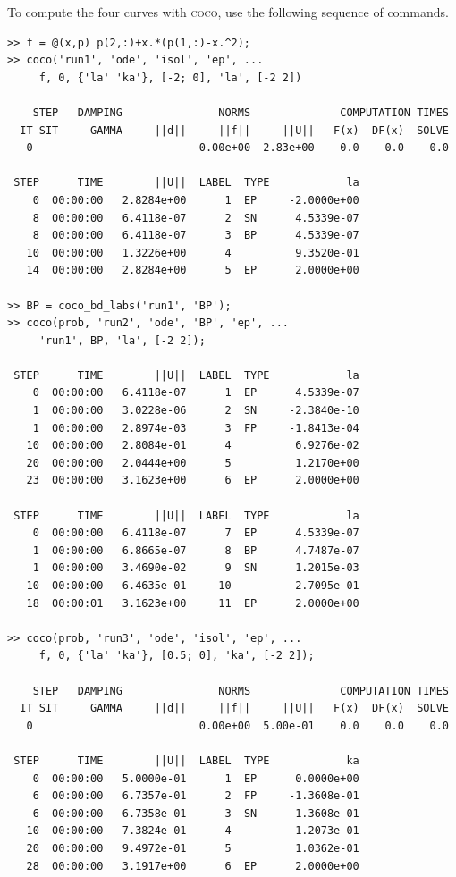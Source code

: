 To compute the four curves with \textsc{coco}, use the following sequence of commands.
\begin{lstlisting}[language=coco-highlight,frame=lines]
>> f = @(x,p) p(2,:)+x.*(p(1,:)-x.^2);
>> coco('run1', 'ode', 'isol', 'ep', ...
     f, 0, {'la' 'ka'}, [-2; 0], 'la', [-2 2])

    STEP   DAMPING               NORMS              COMPUTATION TIMES
  IT SIT     GAMMA     ||d||     ||f||     ||U||   F(x)  DF(x)  SOLVE
   0                          0.00e+00  2.83e+00    0.0    0.0    0.0

 STEP      TIME        ||U||  LABEL  TYPE            la
    0  00:00:00   2.8284e+00      1  EP     -2.0000e+00
    8  00:00:00   6.4118e-07      2  SN      4.5339e-07
    8  00:00:00   6.4118e-07      3  BP      4.5339e-07
   10  00:00:00   1.3226e+00      4          9.3520e-01
   14  00:00:00   2.8284e+00      5  EP      2.0000e+00

>> BP = coco_bd_labs('run1', 'BP');
>> coco(prob, 'run2', 'ode', 'BP', 'ep', ...
     'run1', BP, 'la', [-2 2]);

 STEP      TIME        ||U||  LABEL  TYPE            la
    0  00:00:00   6.4118e-07      1  EP      4.5339e-07
    1  00:00:00   3.0228e-06      2  SN     -2.3840e-10
    1  00:00:00   2.8974e-03      3  FP     -1.8413e-04
   10  00:00:00   2.8084e-01      4          6.9276e-02
   20  00:00:00   2.0444e+00      5          1.2170e+00
   23  00:00:00   3.1623e+00      6  EP      2.0000e+00

 STEP      TIME        ||U||  LABEL  TYPE            la
    0  00:00:00   6.4118e-07      7  EP      4.5339e-07
    1  00:00:00   6.8665e-07      8  BP      4.7487e-07
    1  00:00:00   3.4690e-02      9  SN      1.2015e-03
   10  00:00:00   6.4635e-01     10          2.7095e-01
   18  00:00:01   3.1623e+00     11  EP      2.0000e+00

>> coco(prob, 'run3', 'ode', 'isol', 'ep', ...
     f, 0, {'la' 'ka'}, [0.5; 0], 'ka', [-2 2]);

    STEP   DAMPING               NORMS              COMPUTATION TIMES
  IT SIT     GAMMA     ||d||     ||f||     ||U||   F(x)  DF(x)  SOLVE
   0                          0.00e+00  5.00e-01    0.0    0.0    0.0

 STEP      TIME        ||U||  LABEL  TYPE            ka
    0  00:00:00   5.0000e-01      1  EP      0.0000e+00
    6  00:00:00   6.7357e-01      2  FP     -1.3608e-01
    6  00:00:00   6.7358e-01      3  SN     -1.3608e-01
   10  00:00:00   7.3824e-01      4         -1.2073e-01
   20  00:00:00   9.4972e-01      5          1.0362e-01
   28  00:00:00   3.1917e+00      6  EP      2.0000e+00


\end{lstlisting}
